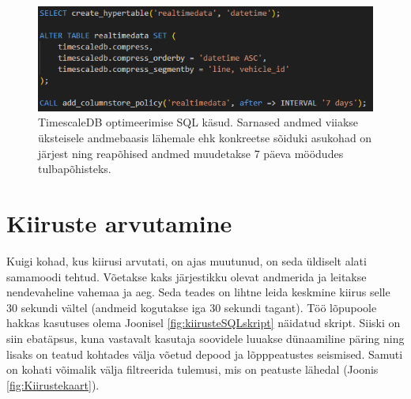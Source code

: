 \begin{figure}[H] %
    \centering
    \includegraphics[width=.8\textwidth]{figures/timescaleDBSQL.png} %
    \caption{TimescaleDB optimeerimise SQL käsud. Sarnased andmed viiakse üksteisele andmebaasis lähemale ehk konkreetse sõiduki asukohad on järjest ning reapõhised andmed muudetakse 7 päeva möödudes tulbapõhisteks. } %
    \label{fig:TimescaleDB} %
\end{figure}

\section{Kiiruste arvutamine}

Kuigi kohad, kus kiirusi arvutati, on ajas muutunud, on seda üldiselt alati samamoodi tehtud. Võetakse kaks järjestikku olevat andmerida ja leitakse nendevaheline vahemaa ja aeg. Seda teades on lihtne leida keskmine kiirus selle 30 sekundi vältel (andmeid kogutakse iga 30 sekundi tagant). Töö lõpupoole hakkas kasutuses olema Joonisel \ref{fig:kiirusteSQLskript} näidatud skript. Siiski on siin ebatäpsus, kuna vastavalt kasutaja soovidele luuakse dünaamiline päring ning lisaks on teatud kohtades välja võetud depood ja lõpppeatustes seismised. Samuti on kohati võimalik välja filtreerida tulemusi, mis on peatuste lähedal (Joonis \ref{fig:Kiirustekaart}).  

